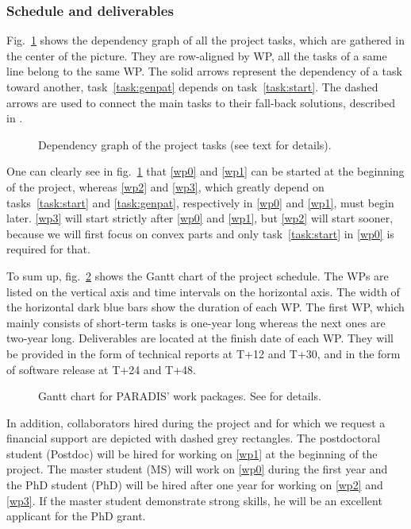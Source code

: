 \subsubsection{Schedule and deliverables}
\label{sec:schedule}

Fig.~\ref{fig:tasks} shows the dependency graph of all the project tasks, which
are gathered in the center of the picture. They are row-aligned by WP,
\ie all the tasks of a same line belong to the same WP. 
The solid arrows represent the dependency of a task toward another,
\eg task~\ref{task:genpat} depends on task~\ref{task:start}. 
The dashed arrows are used to connect the main tasks to their fall-back solutions,
described in . 

\begin{figure}[htbp]
  \centering
  
  \caption{Dependency graph of the project tasks (see text for details).} %
  \label{fig:tasks}
\end{figure}

One can clearly see in fig.~\ref{fig:tasks} that \ref{wp0} and \ref{wp1} can be started
at the beginning of the project, whereas \ref{wp2} and \ref{wp3}, which greatly depend
on tasks~\ref{task:start} and \ref{task:genpat}, respectively in \ref{wp0} and \ref{wp1},
must begin later. \ref{wp3} will start strictly after \ref{wp0} and \ref{wp1}, but \ref{wp2}
will start sooner, because we will first focus on convex parts and only task~\ref{task:start}
in \ref{wp0} is required for that.

To sum up, fig.~\ref{fig:gantt} shows the Gantt chart of the project schedule.
The WPs are listed on the vertical axis and time intervals on the horizontal axis.
The width of the horizontal dark blue bars show the duration of each WP. The first WP,
which mainly consists of short-term tasks is one-year long whereas the next ones are
two-year long. Deliverables are located at the finish date of each WP. They will be
provided in the form of technical reports at T+12 and T+30, and in the form of software
release at T+24 and T+48.

\begin{figure}[htbp]
  \centering
  
  \caption{Gantt chart for PARADIS' work packages. See  for details.}
  \label{fig:gantt}
\end{figure}

In addition, collaborators hired during the project and for which we request a financial support
are depicted with dashed grey rectangles.
The postdoctoral student (Postdoc) will be hired for working on \ref{wp1} at the beginning of the project.
The master student (MS) will work on \ref{wp0} during the first year and the PhD student (PhD) will be
hired after one year for working on \ref{wp2} and \ref{wp3}. If the master student demonstrate strong skills,
he will be an excellent applicant for the PhD grant.

